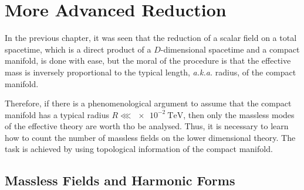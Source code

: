 \chapter{More Advanced \KK Reduction}

In the previous chapter, it was seen that the \KK reduction of a scalar field on a total spacetime, which is a direct product of a $D$-dimensional spacetime and a compact manifold, is done with ease, but the moral of the procedure is that the effective mass is inversely proportional to the typical length, {\it a.k.a.} radius, of the compact manifold.

Therefore, if there is a phenomenological argument to assume that the compact manifold has a typical radius $R\lll \SI{e-2}{\TeV}$, then only the massless modes of the effective theory are worth tho be analysed. Thus, it is necessary to learn how to count the number of massless fields on the lower dimensional theory. The task is achieved by using topological information of the compact manifold.

\section{Massless Fields and Harmonic Forms}

